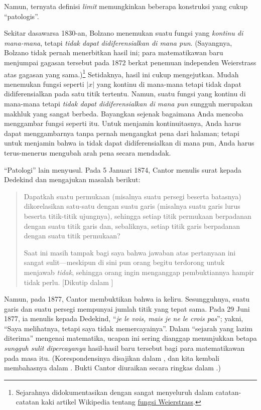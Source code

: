 \documentclass[../../../include/open-logic-section]{subfiles}
\begin{document}

Namun, ternyata definisi \emph{limit} memungkinkan beberapa konstruksi yang
cukup ``patologis''.

Sekitar dasawarsa 1830-an, Bolzano menemukan suatu fungsi yang
\emph{kontinu di mana-mana}, tetapi \emph{tidak dapat didiferensialkan di
mana pun}. (Sayangnya, Bolzano tidak pernah menerbitkan hasil ini; para
matematikawan baru menjumpai gagasan tersebut pada 1872 berkat penemuan
independen Weierstrass atas gagasan yang sama.)\footnote{Sejarahnya
didokumentasikan dengan sangat menyeluruh dalam catatan-catatan kaki artikel
Wikipedia tentang
\href{http://en.wikipedia.org/wiki/Weierstrass_function}{fungsi
Weierstrass}.} Setidaknya, hasil ini cukup mengejutkan. Mudah menemukan
fungsi seperti $|x|$ yang kontinu di mana-mana tetapi tidak dapat
didiferensialkan pada satu titik tertentu. Namun, suatu fungsi yang kontinu
di mana-mana tetapi \emph{tidak dapat didiferensialkan di mana pun} sungguh
merupakan makhluk yang sangat berbeda. Bayangkan sejenak bagaimana Anda
mencoba menggambar fungsi seperti itu. Untuk menjamin kontinuitasnya, Anda
harus dapat menggambarnya tanpa pernah mengangkat pena dari halaman; tetapi
untuk menjamin bahwa ia tidak dapat didiferensialkan di mana pun, Anda harus
terus-menerus mengubah arah pena secara mendadak.

``Patologi'' lain menyusul. Pada 5 Januari 1874, Cantor menulis surat
kepada Dedekind dan mengajukan masalah berikut:
\begin{quote}
Dapatkah suatu permukaan (misalnya suatu persegi beserta batasnya)
dikorelasikan satu-satu dengan suatu garis (misalnya suatu garis lurus
beserta titik-titik ujungnya), sehingga setiap titik permukaan berpadanan
dengan suatu titik garis dan, sebaliknya, setiap titik garis berpadanan
dengan suatu titik permukaan?

Saat ini masih tampak bagi saya bahwa jawaban atas pertanyaan ini sangat
sulit---meskipun di sini pun orang begitu terdorong untuk menjawab
\emph{tidak}, sehingga orang ingin menganggap pembuktiannya hampir tidak
perlu. [Dikutip dalam \citealt{Gouvea2011}]
\end{quote}
Namun, pada 1877, Cantor membuktikan bahwa ia keliru. Sesungguhnya, suatu
garis dan suatu persegi mempunyai jumlah titik yang tepat sama. Pada
29 Juni 1877, ia menulis kepada Dedekind,
``\emph{je le vois, mais je ne le crois pas}''; yakni,
``Saya melihatnya, tetapi saya tidak memercayainya''. Dalam
``sejarah yang lazim diterima'' mengenai matematika, ucapan ini sering
dianggap menunjukkan betapa \emph{sungguh sulit dipercayanya} hasil-hasil
baru tersebut bagi para matematikawan pada masa itu. (Korespondensinya
disajikan dalam \citet{Gouvea2011}, dan kita kembali membahasnya dalam
. Bukti Cantor diuraikan secara ringkas
dalam .)
\end{document}
